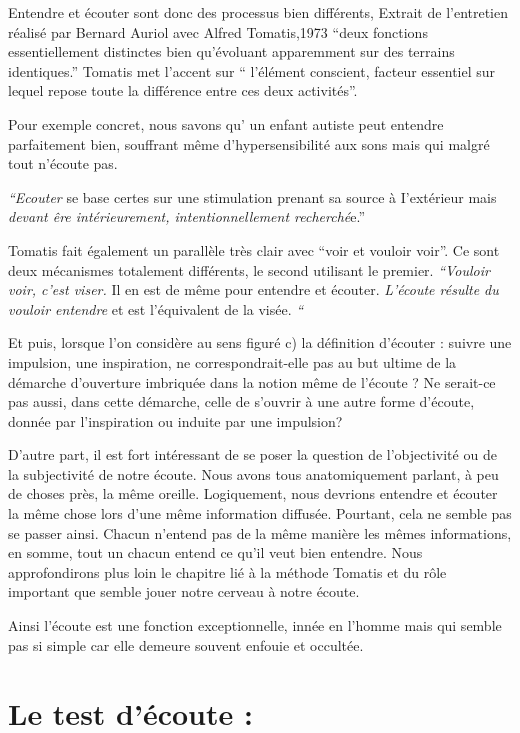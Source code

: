 \documentclass[12pt,french]{report}
\makeatletter
\let\SF@@footnote\footnote
\def\footnote{\ifx\protect\@typeset@protect
    \expandafter\SF@@footnote
  \else
    \expandafter\SF@gobble@opt
  \fi
}
\edef\SF@gobble@opt{\noexpand\protect
  \expandafter\noexpand\csname SF@gobble@opt \endcsname}
\makeatother
\begin{document}
Entendre et écouter sont donc des processus bien différents, \footnote{Extrait de l'entretien réalisé par Bernard Auriol avec Alfred Tomatis,1973 }``deux
fonctions essentiellement distinctes bien qu'évoluant apparemment
sur des terrains identiques.'' Tomatis met l'accent sur `` l'élément
conscient, facteur essentiel sur lequel repose toute la différence
entre ces deux activités''.

Pour exemple concret, nous savons qu' un enfant autiste peut entendre
parfaitement bien, souffrant même d'hypersensibilité aux sons mais
qui malgré tout n'écoute pas.\emph{ }

\emph{``Ecouter} se base certes sur une stimulation prenant sa source
à I'extérieur mais \emph{devant êre intérieurement, intentionnellement
recherché}e.'' 

Tomatis fait également un parallèle très clair avec ``voir et vouloir
voir''. Ce sont deux mécanismes totalement différents, le second
utilisant le premier. \emph{``Vouloir voir, c'est viser. }Il en est
de même pour entendre et écouter.\emph{ L\textquoteright écoute résulte
du vouloir entendre }et est l\textquoteright équivalent de la visée.\emph{
``}

Et puis, lorsque l'on considère au sens figuré c) la définition d'écouter
: suivre une impulsion, une inspiration, ne correspondrait-elle pas
au but ultime de la démarche d'ouverture imbriquée dans la notion
même de l'écoute ? Ne serait-ce pas aussi, dans cette démarche, celle
de s'ouvrir à une autre forme d'écoute, donnée par l'inspiration ou
induite par une impulsion? 

D'autre part, il est fort intéressant de se poser la question de l'objectivité
ou de la subjectivité de notre écoute. Nous avons tous anatomiquement
parlant, à peu de choses près, la même oreille. Logiquement, nous
devrions entendre et écouter la même chose lors d'une même information
diffusée. Pourtant, cela ne semble pas se passer ainsi. Chacun n'entend
pas de la même manière les mêmes informations, en somme, tout un chacun
entend ce qu'il veut bien entendre. Nous approfondirons plus loin
le chapitre lié à la méthode Tomatis et du rôle important que semble
jouer notre cerveau à notre écoute. 

Ainsi l'écoute est une fonction exceptionnelle, innée en l'homme mais
qui semble pas si simple car elle demeure souvent enfouie et occultée.

\section{Le test d'écoute :}
\end{document}
